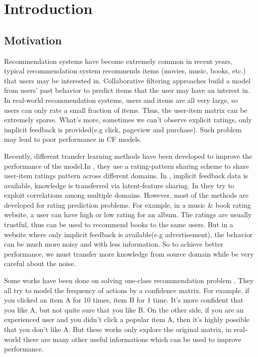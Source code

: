 \chapter{Introduction}
\label{chp:intro}

\hspace{0.1in}
\section{Motivation}
Recommendation systems have become extremely common in recent years, typical recommendation system recommends items (movies, music, books, etc.) that users may be interested in. Collaborative filtering approaches build a model from users' past behavior to predict items that the user may have an interest in. 
In real-world recommendation systems, users and items are all very large, so users can only rate a small fraction of items. Thus, the user-item matrix can be extremely sparse. What's more, sometimes we can't observe explicit ratings, only implicit feedback is provided(e.g click, pageview and purchase). Such problem may lead to poor performance in CF models.

Recently, different transfer learning methods have been developed to improve the performance of the model.In \cite{/ijcai/libin09, /icml/libin09}, they use a rating-pattern sharing scheme to share user-item ratings pattern across different domains. In \cite{/aaai/WPan12, Pan:2011:TLP:2283696.2283784}, implicit feedback data is available, knowledge is transferred via latent-feature sharing. In \cite{/uai/ZhangCY10, DBLP:conf/aaai/EldardiryN11} they try to exploit correlations among multiple domains.
However, most of the methods are developed for rating prediction problems. For example, in a music \& book rating website, a user can have high or low rating for an album. The ratings are usually trustful, thus can be used to recommend books to the same users. But in a website where only implicit feedback is available(e.g advertisement), the behavior can be much more noisy and with less information. So to achieve better performance, we must transfer more knowledge from source domain while be very careful about the noise.

Some works have been done on solving one-class recommendation problem \cite{4781121, 4781145, DBLP:dblp_conf/aaai/LinKH14}. They all try to model the frequency of actions by a confidence matrix. For example, if you clicked an item A for 10 times, item B for 1 time. It's more confident that you like A, but not quite sure that you like B. On the other side, if you are an experienced user and you didn't click a popular item A, then it's highly possible that you don't like A. But these works only explore the original matrix, in real-world there are many other useful informations which can be used to improve performance.


